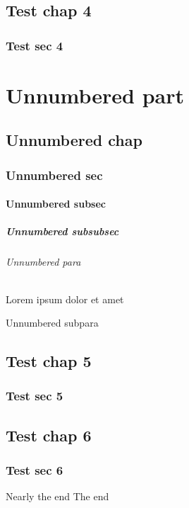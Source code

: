 \documentclass[]{article}
\begin{document}
    \chapter{Test chap 4}
    \section{Test sec 4}
    
    \part*{Unnumbered part}
    \chapter*{Unnumbered chap}
    \section*{Unnumbered sec}
    \subsection*{Unnumbered subsec}
    \subsubsection*{Unnumbered subsubsec}
    \paragraph*{Unnumbered para} Lorem ipsum dolor et amet
    \subparagraph*{Unnumbered subpara}
    
    \appendix
    \chapter{Test chap 5}
    \section{Test sec 5}
    
    \backmatter
    \chapter{Test chap 6}
    \section{Test sec 6}
    \clearpage
    Nearly the end
    \clearpage
    The end
\end{document}

